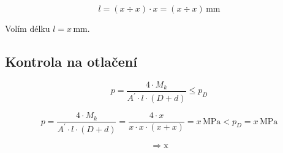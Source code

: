 \documentclass[a4paper,11pt]{article}
\newcommand{\Mk}{x} %
\newcommand{\pD}{x} %
\newcommand{\dDraz}{x} %
\newcommand{\DDraz}{x} %
\newcommand{\Adr}{x} %
\newcommand{\lKoefMinDraz}{x} %
\newcommand{\lKoefMaxDraz}{x} %
\newcommand{\lMinDraz}{x} %
\newcommand{\lMaxDraz}{x} %
\newcommand{\lDraz}{x} %
\newcommand{\pSkutDraz}{x} %
\newcommand{\drazVysledek}{x} %
\begin{document}
\[ l = (\lKoefMinDraz{} \div \lKoefMaxDraz{}) \cdot \dDraz{} = (\lMinDraz{} \div \lMaxDraz{}) \mathrm{\,mm} \]

Volím délku $l = \lDraz{} \mathrm{\,mm}$.

\subsection{Kontrola na otlačení}

\[ p = \frac{4 \cdot M_k}{A^{'} \cdot l \cdot (D + d)} \leq p_D \]

\[ p = \frac{4 \cdot M_k}{A^{'} \cdot l \cdot (D + d)} = \frac{4 \cdot \Mk{}}{\Adr{} \cdot \lDraz{} \cdot (\DDraz{} + \dDraz{})} = \pSkutDraz{} \mathrm{\,MPa} < p_D = \pD{} \mathrm{\,MPa} \]

\[ \Rightarrow \mathrm{\drazVysledek{}} \]
\end{document}
